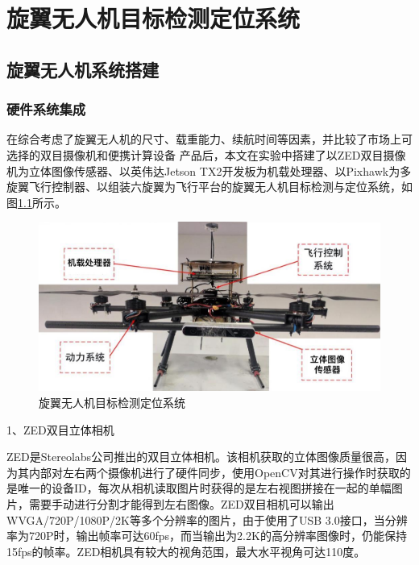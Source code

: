 
\chapter{旋翼无人机目标检测定位系统}

\section{旋翼无人机系统搭建}
\subsection{硬件系统集成}
在综合考虑了旋翼无人机的尺寸、载重能力、续航时间等因素，并比较了市场上可选择的双目摄像机和便携计算设备
产品后，本文在实验中搭建了以ZED双目摄像机为立体图像传感器、以英伟达Jetson TX2开发板为机载处理器、以Pixhawk为多旋翼飞行控制器、以组装六旋翼为飞行平台的旋翼无人机目标检测与定位系统，如图\ref{fig:5_1_旋翼无人机目标检测定位系统}所示。

\begin{figure}[htb] %
	\centering
	\includegraphics[width=6in]{figures/5_平台介绍/旋翼无人机目标检测定位系统}
	\caption{旋翼无人机目标检测定位系统}\label{fig:5_1_旋翼无人机目标检测定位系统}
\end{figure}

1、ZED双目立体相机

ZED是Stereolabs公司推出的双目立体相机。该相机获取的立体图像质量很高，因为其内部对左右两个摄像机进行了硬件同步，使用OpenCV对其进行操作时获取的是唯一的设备ID，每次从相机读取图片时获得的是左右视图拼接在一起的单幅图片，需要手动进行分割才能得到左右图像。ZED双目相机可以输出WVGA/720P/1080P/2K等多个分辨率的图片，由于使用了USB 3.0接口，当分辨率为720P时，输出帧率可达60fps，而当输出为2.2K的高分辨率图像时，仍能保持15fps的帧率。ZED相机具有较大的视角范围，最大水平视角可达110度。

